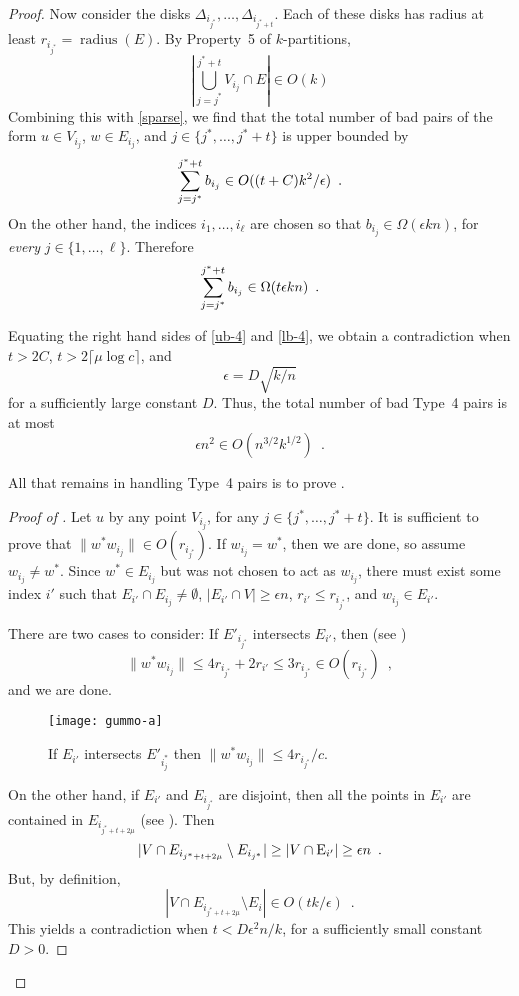 \documentclass{patmorin}
\DeclareMathOperator{\radius}{radius}
\begin{document}
\begin{proof}
  Now consider the disks
  $\Delta_{i_{j^*}},\ldots,\Delta_{i_{j^*+t}}$. Each of these disks
  has radius at least $r_{i_{j^*}}=\radius(E)$.  By Property~5 of
  $k$-partitions,
  \[
    \left|\bigcup_{j=j^*}^{j^*+t} V_{i_{j}}\cap E\right|
      \in O(k)
  \]
  Combining this with \eqref{sparse}, we find that the total number
  of bad pairs of the form $u\in V_{i_{j}}$, $w\in E_{i_{j}}$,
  and $j\in\{j^*,\ldots,j^*+t\}$ is upper bounded by
  \begin{equation}
     \sum_{j=j^*}^{j^*+t} b_{i_{j}} 
        \in O((t+C)k^2/\epsilon) \enspace . \eqlabel{ub-4}
  \end{equation}
  On the other hand, the indices $i_1,\ldots,i_\ell$ are chosen
  so that $b_{i_j}\in\Omega(\epsilon kn)$, for \emph{every}
  $j\in\{1,\ldots,\ell\}$.  Therefore
  \begin{equation}
    \sum_{j=j^*}^{j^*+t} b_{i_{j}} 
        \in \Omega(t\epsilon kn) \enspace .
        \eqlabel{lb-4}
  \end{equation}
 
  Equating the right hand sides of \eqref{ub-4} and \eqref{lb-4}, we
  obtain a contradiction when $t>2C$, $t>2\lceil\mu\log c\rceil$, and
  \[
      \epsilon = D\sqrt{k/n}
  \] 
  for a sufficiently large constant $D$.
  Thus, the total number of bad Type~4 pairs is at most
  \[
    \epsilon n^2 \in O(n^{3/2}k^{1/2}) \enspace .
  \]

  All that remains in handling Type~4 pairs is to prove .

  \begin{proof}[Proof of ]
  Let $u$ by any point $V_{i_{j}}$, for any $j\in\{j^*,\ldots,j^*+t\}$.
  It is sufficient to prove that $\|w^*w_{i_{j}}\|\in O(r_{i_{j^*}})$.
  If $w_{i_{j}}=w^*$, then we are done, so assume $w_{i_{j}}\neq
  w^*$.  Since $w^*\in E_{i_{j}}$ but was not chosen to act as
  $w_{i_{j}}$, there must exist some index $i'$ such that $E_{i'}\cap
  E_{i_{j}}\neq\emptyset$, $|E_{i'}\cap V|\ge\epsilon n$, $r_{i'}\le
  r_{i_{j^*}}$, and $w_{i_{j}}\in E_{i'}$.

  There are two cases to consider:
  If $E'_{i_{j^*}}$ intersects $E_{i'}$, then (see )
  \[
     \|w^*w_{i_j}\|\le 4r_{i_{j^*}} + 2r_{i'} \le 3r_{i_{j^*}} \in O(r_{i_{j^*}}) \enspace ,
  \]
  and we are done. 
  \begin{figure}
    \begin{center}
      \texttt{[image: gummo-a]}
      \caption{If $E_{i'}$ intersects $E'_{i_j^*}$ then $\|w^*w_{i_j}\|\le 4r_{i_{j^*}}/c$.}
    \end{center}
  \end{figure}
  On the other hand, if $E_{i'}$ and $E_{i_{j^*}}$
  are disjoint, then all the points in $E_{i'}$ are contained in
  $E_{i_{j^*+t+2\mu}}$ (see ).  Then
  \[
      |V\cap E_{i_{j^*+t+2\mu}}\setminus E_{i_{j^*}}| 
          \ge |V\cap\mathrm{E}_{i'}| \ge \epsilon n \enspace .
  \]
  But, by definition, 
  \[
      |V\cap E_{i_{j^*+t+2\mu}}\setminus E_i| \in O(tk/\epsilon) \enspace .
  \]
  This yields a contradiction when $t<D \epsilon^2 n/k$, for a
  sufficiently small constant $D>0$.
  \end{proof}



\end{proof}
\end{document}

